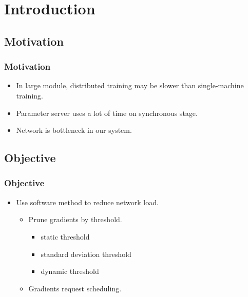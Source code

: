 \section{Introduction}

\subsection{Motivation}
\begin{frame}
    \frametitle{Motivation}
	\begin{itemize}
		\item In large module, distributed training may be slower than single-machine training. 
		\item Parameter server uses a lot of time on synchronous stage. 
		\item Network is bottleneck in our system. 
	\end{itemize}
\end{frame}


\subsection{Objective}
\begin{frame}
    \frametitle{Objective}
    \begin{itemize}
		\item Use software method to reduce network load. 
			\begin{itemize}
				\item Prune gradients by threshold. 
					\begin{itemize}
						\item static threshold
						\item standard deviation threshold
						\item dynamic threshold
					\end{itemize}
				\item Gradients request scheduling. 
			\end{itemize}
	\end{itemize}
\end{frame}


